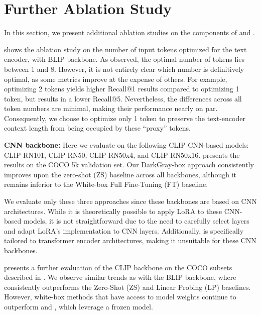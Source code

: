 \section{Further Ablation Study}
\label{sec:further_ablations}
In this section, we present additional ablation studies on the components of \ours and \oursp.

 shows the ablation study on the number of input tokens optimized for the text encoder, with BLIP backbone. As observed, the optimal number of tokens lies between 1 and 8. However, it is not entirely clear which number is definitively optimal, as some metrics improve at the expense of others. For example, optimizing 2 tokens yields higher Recall@1 results compared to optimizing 1 token, but results in a lower Recall@5. Nevertheless, the differences across all token numbers are minimal, making their performance nearly on par. Consequently, we choose to optimize only 1 token to preserve the text-encoder context length from being occupied by these ``proxy'' tokens.

{\bf CNN backbone:} Here we evaluate \ours on the following CLIP CNN-based models: CLIP-RN101, CLIP-RN50, CLIP-RN50x4, and CLIP-RN50x16.  presents the results on the COCO 5k validation set. Our DarkGray-box approach consistently improves upon the zero-shot (ZS) baseline across all backbones, although it remains inferior to the White-box Full Fine-Tuning (FT) baseline. 

We evaluate only these three approaches since these backbones are based on CNN architectures. While it is theoretically possible to apply LoRA to these CNN-based models, it is not straightforward due to the need to carefully select layers and adapt LoRA’s implementation to CNN layers. Additionally, \oursp is specifically tailored to transformer encoder architectures, making it unsuitable for these CNN backbones.

 presents a further evaluation of the CLIP backbone on the COCO subsets described in . We observe similar trends as with the BLIP backbone, where \ours consistently outperforms the Zero-Shot (ZS) and Linear Probing (LP) baselines. However, white-box methods that have access to model weights continue to outperform \ours and \oursp, which leverage a frozen model.




